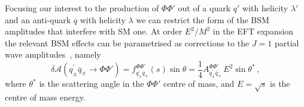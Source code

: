 Focusing our interest to the production of $\Phi\Phi'$ out of a quark $q'$ with helicity $\lambda'$ and an anti-quark ${\overline{q}}$ with helicity $\lambda$ we can restrict the form of the BSM amplitudes that interfere with SM one.
At order  $E^2/M^2$ in the EFT expansion the relevant BSM effects can be parametrised as corrections to the $J=1$ partial wave amplitudes~\cite{Franceschini:2017ab}, namely
\begin{equation}\label{amp0}
\delta{\mathcal{A}}\left(q^\prime_{\pm}{\overline{q}}_{\mp}\rightarrow\Phi\Phi'\right)= f^{\Phi\Phi'}_{q^\prime_{\pm}{\overline{q}}_{\mp}}(s)\sin\theta=  \frac{1}{4} A^{\Phi\Phi'}_{q^\prime_{\pm}{\overline{q}}_{\mp}}\, E^2 \sin\theta^*\,,
\end{equation}
where $\theta^*$ is the scattering angle in the $\Phi\Phi'$ centre of mass, and $E=\sqrt{s}$ is the centre of mass energy.

